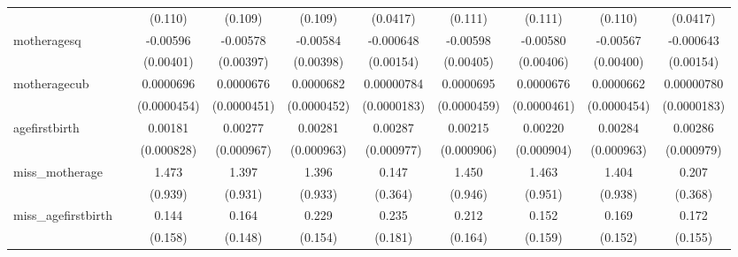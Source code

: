 \begin{table}[htbp]
\begin{tabular}{l*{9}{c}}
            &                     &     (0.110)         &     (0.109)         &     (0.109)         &    (0.0417)         &     (0.111)         &     (0.111)         &     (0.110)         &    (0.0417)         \\
[1em]
motheragesq &                     &    -0.00596         &    -0.00578         &    -0.00584         &   -0.000648         &    -0.00598         &    -0.00580         &    -0.00567         &   -0.000643         \\
            &                     &   (0.00401)         &   (0.00397)         &   (0.00398)         &   (0.00154)         &   (0.00405)         &   (0.00406)         &   (0.00400)         &   (0.00154)         \\
[1em]
motheragecub&                     &   0.0000696         &   0.0000676         &   0.0000682         &  0.00000784         &   0.0000695         &   0.0000676         &   0.0000662         &  0.00000780         \\
            &                     & (0.0000454)         & (0.0000451)         & (0.0000452)         & (0.0000183)         & (0.0000459)         & (0.0000461)         & (0.0000454)         & (0.0000183)         \\
[1em]
agefirstbirth&                     &     0.00181\sym{**} &     0.00277\sym{***}&     0.00281\sym{***}&     0.00287\sym{***}&     0.00215\sym{**} &     0.00220\sym{**} &     0.00284\sym{***}&     0.00286\sym{***}\\
            &                     &  (0.000828)         &  (0.000967)         &  (0.000963)         &  (0.000977)         &  (0.000906)         &  (0.000904)         &  (0.000963)         &  (0.000979)         \\
[1em]
miss\_motherage&                     &       1.473         &       1.397         &       1.396         &       0.147         &       1.450         &       1.463         &       1.404         &       0.207         \\
            &                     &     (0.939)         &     (0.931)         &     (0.933)         &     (0.364)         &     (0.946)         &     (0.951)         &     (0.938)         &     (0.368)         \\
[1em]
miss\_agefirstbirth&                     &       0.144         &       0.164         &       0.229         &       0.235         &       0.212         &       0.152         &       0.169         &       0.172         \\
            &                     &     (0.158)         &     (0.148)         &     (0.154)         &     (0.181)         &     (0.164)         &     (0.159)         &     (0.152)         &     (0.155)         \\

\end{tabular}
\end{table}
